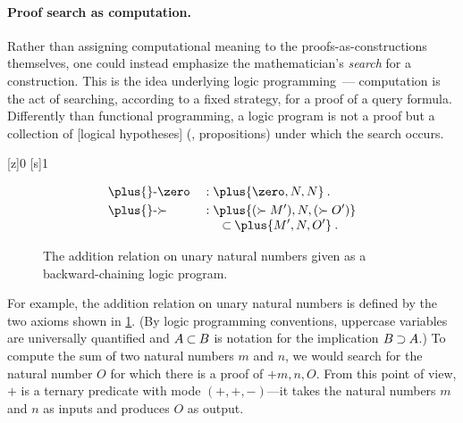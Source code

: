 

\paragraph*{Proof search as computation.}
Rather than assigning computational meaning to the proofs-as-constructions themselves, one could instead
emphasize the mathematician's \emph{search} for a construction.
This is the idea underlying logic programming~\autocites{Colmerauer+:73}{Kowalski:IFIP74}---%
computation is the act of searching, according to a fixed strategy, for a proof of a query formula.
Differently than functional programming, a logic program is not a proof but a collection of [logical hypotheses] (\ie, propositions) under which the search occurs.

\NewPredicate{\zero}[z]{0}
\RenewPredicate{\succ}[s]{1}

\begin{figure}[!tbp]
  \begin{alignat*}{2}
    &\text{$\plus{}$-$\zero$}   &&: \plus{\zero,N,N} \:. \\
    &\text{$\plus{}$-$\succ{}$} &&: \!\begin{aligned}[t]
                                        \MoveEqLeft[0.5]
                                        \plus{(\succ{M'}),N,(\succ{O'})} \\[-\jot]
                                          &\pmi \plus{M',N,O'} \:.
                                      \end{aligned}
  \end{alignat*}
  \caption{The addition relation on unary natural numbers given as a backward-chaining logic program.\label{fig:plus-lp}}
\end{figure}
For example, the addition relation on unary natural numbers is defined by the two axioms shown in \cref{fig:plus-lp}.
(By logic programming conventions, uppercase variables are universally quantified and $A \mathbin{\subset} B$ is notation for the implication $B \mathbin{\supset} A$.)
To compute the sum of two natural numbers $m$ and $n$, we would search for the natural number $O$ for which there is a proof of $\plus{m,n,O}$.
From this point of view, $\plus{}$ is a ternary predicate with mode $(+,+,-)$---it takes the natural numbers $m$ and $n$ as inputs and produces $O$ as output.


